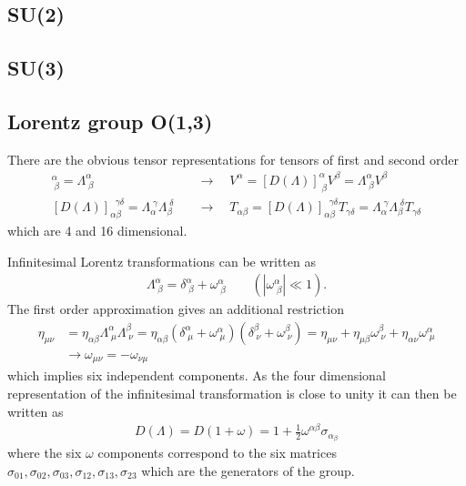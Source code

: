 \documentclass[10pt,a4paper]{article}
\theoremstyle{definition}
\begin{document}
\subsection{SU(2)}
\subsection{SU(3)}

\subsection{Lorentz group O(1,3)}
There are the obvious tensor representations for tensors of first and second order
\begin{align}
    [D(\Lambda)]^\alpha_{\;\beta}=\Lambda^\alpha_{\;\beta}\quad &\rightarrow\quad V^\alpha = [D(\Lambda)]^\alpha_{\;\beta} V^\beta=\Lambda^\alpha_{\;\beta} V^\beta\\
    [D(\Lambda)]_{\alpha\beta}^{\;\;\gamma\delta}=\Lambda_\alpha^{\;\gamma}\Lambda_\beta^{\;\delta}\quad&\rightarrow\quad T_{\alpha\beta} = [D(\Lambda)]_{\alpha\beta}^{\;\;\gamma\delta} T_{\gamma\delta}=\Lambda_\alpha^{\;\gamma}\Lambda_\beta^{\;\delta}T_{\gamma\delta}
\end{align}
which are 4 and 16 dimensional.

Infinitesimal Lorentz transformations can be written as
\begin{align}
    \Lambda^\alpha_{\;\beta}=\delta^\alpha_{\;\beta}+\omega^\alpha_{\;\beta}\qquad(|\omega^\alpha_{\;\beta}|\ll 1).
\end{align}
The first order approximation gives an additional restriction
\begin{align}
    \eta_{\mu\nu} &= \eta_{\alpha\beta}\Lambda^\alpha_{\;\mu}\Lambda^\beta_{\;\nu}=\eta_{\alpha\beta}(\delta^\alpha_{\;\mu}+\omega^\alpha_{\;\mu})(\delta^\beta_{\;\nu}+\omega^\beta_{\;\nu})=\eta_{\mu\nu}+\eta_{\mu\beta}\omega^\beta_{\;\nu}+\eta_{\alpha\nu}\omega^\alpha_{\;\mu}\\
    &\rightarrow \omega_{\mu\nu}=-\omega_{\nu\mu}
\end{align}
which implies six independent components. As the four dimensional representation of the infinitesimal transformation is close to unity it can then be written as
\begin{align}
    D(\Lambda)=D(1+\omega)=1+\frac{1}{2}\omega^{\alpha\beta}\sigma_{\alpha_\beta}
\end{align}
where the six $\omega$ components correspond to the six matrices $\sigma_{01},\sigma_{02},\sigma_{03},\sigma_{12},\sigma_{13},\sigma_{23}$ which are the generators of the group.
\end{document}
